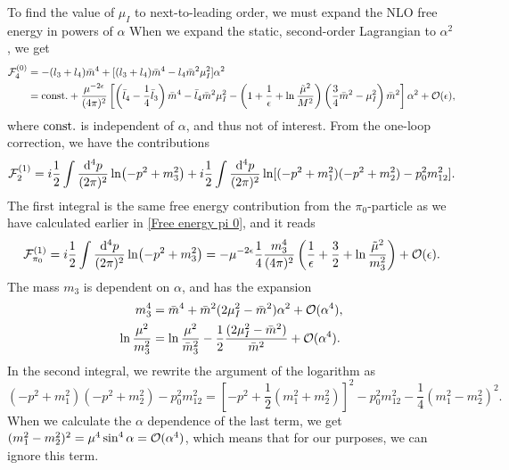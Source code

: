 To find the value of $\mu_I$ to next-to-leading order, we must expand the NLO free energy in powers of $\alpha$
When we expand the static, second-order Lagrangian to $\alpha^2$, we get
%
\begin{align}
    \nonumber
    \mathcal{F}_4^{(0)}
    &= - (l_3 + l_4)\bar m^4 + [(l_3 + l_4)\bar m^4 -l_4 \bar m^2\mu_I^2]\alpha^2
    \\
    & =
    \mathrm{const.} + 
    \frac{\mu^{-2\epsilon}}{(4\pi)^2}
    \left[
        \left(
            \bar l_4 - \frac{1}{4}\bar l_3
        \right)\bar m^4
        -\bar l_4\bar m^2\mu_I^2
        -\left(
            1 + \frac{1}{\epsilon} + \ln\frac{\tilde \mu^2}{M^2}
        \right)
        \left(\frac{3}{4}\bar m^2 - \mu_I^2\right)\bar m^2
    \right]\alpha^2 + \mathcal{O}(\epsilon),
\end{align}
%
where $\mathrm{const.}$ is independent of $\alpha$, and thus not of interest.
From the one-loop correction, we have the contributions
%
\begin{equation}
    \mathcal{F}_2^{(1)} = i \frac{1}{2}\int \frac{\dd^4 p}{(2\pi)^2} \ln(-p^2 + m_3^2)
    +  i \frac{1}{2} \int \frac{\dd^4 p}{(2\pi)^2} \ln[(-p^2 + m_1^2)(-p^2 + m_2^2) - p_0^2 m_{12}^2].
\end{equation}
%
The first integral is the same free energy contribution from the $\pi_0$-particle as we have calculated earlier in \autoref{Free energy pi 0}, and it reads
%
\begin{equation}
    \mathcal{F}_{\pi_0}^{(1)}
    = i \frac{1}{2}\int \frac{\dd^4 p}{(2\pi)^2} \ln(-p^2 + m_3^2)
    = - \mu^{-2\epsilon}\frac{1}{4} \frac{m_3^4}{(4 \pi)^2}
    \left(\frac{1}{\epsilon} + \frac{3}{2} + \ln \frac{\tilde \mu^2}{m_3^2}\right) + \mathcal{O}(\epsilon).
\end{equation}
%
The mass $m_3$ is dependent on $\alpha$, and has the expansion
%
\begin{align*}
    m_3^4
    &= \bar m^4 + \bar m^2(2\mu_I^2 - \bar m^2)\alpha^2+\mathcal O(\alpha^4), \\
    \ln \frac{\mu^2}{m_3^2}
    &=
    \ln \frac{\mu^2}{\bar m_3^2} - \frac{1}{2} \frac{(2\mu_I^2 - \bar m^2)}{\bar m^2}+ \mathcal O(\alpha^4).
\end{align*}
%
In the second integral, we rewrite the argument of the logarithm as
%
\begin{equation}
    (-p^2 + m_1^2)(-p^2 + m_2^2) - p_0^2 m_{12}^2
    =  \left[-p^2 + \frac{1}{2}(m_1^2 + m_2^2)\right]^2 - p_0^2 m_{12}^2 - \frac{1}{4}(m_1^2 - m_2^2)^2.
\end{equation}
%
When we calculate the $\alpha$ dependence of the last term, we get  $(m_1^2 - m_2^2)^2 = \mu^4 \sin^4\alpha = \mathcal O(\alpha^4)$, which means that for our purposes, we can ignore this term.
